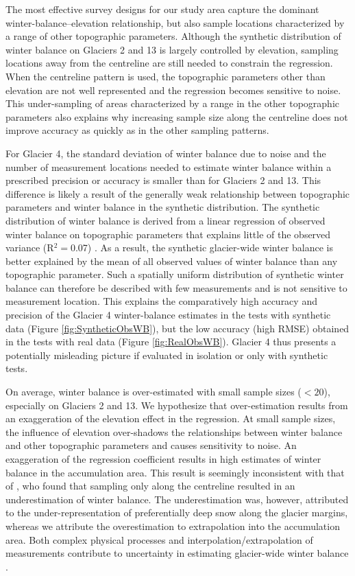 \documentclass{article}
\begin{document}
The most effective survey designs for our study area capture the dominant winter-balance--elevation relationship, but also sample locations characterized by a range of other topographic parameters. Although the synthetic distribution of winter balance on Glaciers 2 and 13 is largely controlled by elevation, sampling locations away from the centreline are still needed to constrain the regression. When the centreline pattern is used, the topographic parameters other than elevation are not well represented and the regression becomes sensitive to noise. This under-sampling of areas characterized by a range in the other topographic parameters also explains why increasing sample size along the centreline  does not improve accuracy as quickly as in the other sampling patterns.

For Glacier 4, the standard deviation of winter balance due to noise and the number of measurement locations needed to estimate winter balance within a prescribed precision or accuracy is smaller than for Glaciers 2 and 13. This difference is likely a result of the generally weak relationship between topographic parameters and winter balance in the synthetic distribution. The synthetic distribution of winter balance is derived from a linear regression of observed winter balance on topographic parameters that explains little of the observed variance (R$^2=$0.07) \citep{Pulwicki2017}. As a result, the synthetic glacier-wide winter balance is better explained by the mean of all observed values of winter balance than any topographic parameter. Such a spatially uniform distribution of synthetic winter balance can therefore be described with few measurements and is not sensitive to measurement location. This explains the comparatively high accuracy and precision of the Glacier 4 winter-balance estimates in the tests with synthetic data (Figure \ref{fig:SyntheticObsWB}), but the low accuracy (high RMSE) obtained in the tests with real data (Figure \ref{fig:RealObsWB}). Glacier 4 thus presents a potentially misleading picture if evaluated in isolation or only with synthetic tests.   

On average, winter balance is over-estimated with small sample sizes ($<20$), especially on Glaciers 2 and 13. We hypothesize that over-estimation results from an exaggeration of the elevation effect in the regression.
At small sample sizes, the influence of elevation over-shadows the relationships between winter balance and other topographic parameters and causes sensitivity to noise. An exaggeration of the regression coefficient results in high estimates of winter balance in the accumulation area. This result is seemingly inconsistent with that of \cite{Walmsley2015}, who found that sampling only along the centreline resulted in an underestimation of winter balance. The underestimation was, however, attributed to the under-representation of preferentially deep snow along the glacier margins, whereas we attribute the overestimation to extrapolation into the accumulation area. Both complex physical processes and interpolation/extrapolation of measurements contribute to uncertainty in estimating glacier-wide winter balance \citep[e.g.][]{Pulwicki2017}. 
\end{document}
